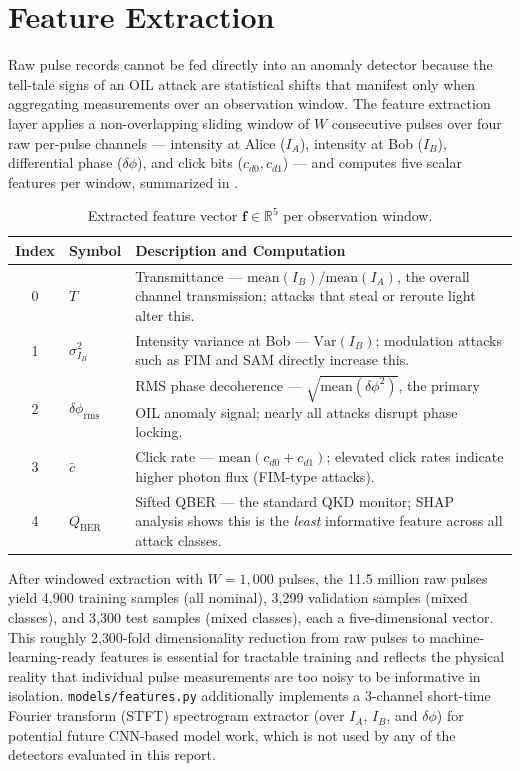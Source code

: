 \documentclass[12pt, a4paper]{report}
\begin{document}
\section{Feature Extraction}\label{sec:feature_extraction}
Raw pulse records cannot be fed directly into an anomaly detector because the tell-tale signs of an OIL attack are statistical shifts that manifest only when aggregating measurements over an observation window. The feature extraction layer applies a non-overlapping sliding window of $W$ consecutive pulses over four raw per-pulse channels — intensity at Alice ($I_A$), intensity at Bob ($I_B$), differential phase ($\delta\phi$), and click bits ($c_{d0}, c_{d1}$) — and computes five scalar features per window, summarized in .

\begin{table}[h]
\centering
\caption{Extracted feature vector $\mathbf{f} \in \mathbb{R}^5$ per observation window.}
\label{tab:features}
\begin{tabular}{@{}clp{8cm}@{}}
\toprule
\textbf{Index} & \textbf{Symbol} & \textbf{Description and Computation} \\
\midrule
0 & $T$ & Transmittance — $\text{mean}(I_B) / \text{mean}(I_A)$, the overall channel transmission; attacks that steal or reroute light alter this. \\
1 & $\sigma^2_{I_B}$ & Intensity variance at Bob — $\text{Var}(I_B)$; modulation attacks such as FIM and SAM directly increase this. \\
2 & $\delta\phi_{\text{rms}}$ & RMS phase decoherence — $\sqrt{\text{mean}(\delta\phi^2)}$, the primary OIL anomaly signal; nearly all attacks disrupt phase locking. \\
3 & $\bar{c}$ & Click rate — $\text{mean}(c_{d0} + c_{d1})$; elevated click rates indicate higher photon flux (FIM-type attacks). \\
4 & $Q_{\text{BER}}$ & Sifted QBER — the standard QKD monitor; SHAP analysis shows this is the \emph{least} informative feature across all attack classes. \\
\bottomrule
\end{tabular}
\end{table}

After windowed extraction with $W = 1{,}000$ pulses, the 11.5 million raw pulses yield 4{,}900 training samples (all nominal), 3{,}299 validation samples (mixed classes), and 3{,}300 test samples (mixed classes), each a five-dimensional vector. This roughly 2{,}300-fold dimensionality reduction from raw pulses to machine-learning-ready features is essential for tractable training and reflects the physical reality that individual pulse measurements are too noisy to be informative in isolation. \texttt{models/features.py} additionally implements a 3-channel short-time Fourier transform (STFT) spectrogram extractor (over $I_A$, $I_B$, and $\delta\phi$) for potential future CNN-based model work, which is not used by any of the detectors evaluated in this report.
\end{document}
